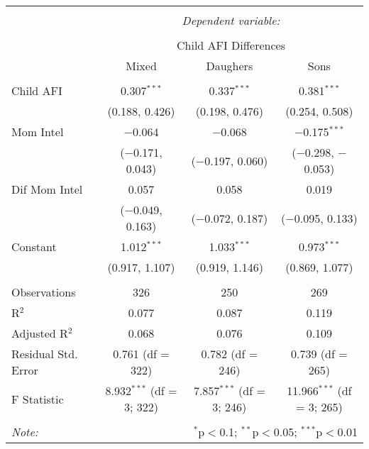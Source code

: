 
\begingroup 
\small 
\begin{tabular}{@{\extracolsep{1pt}}lccc} 
\\[-1.8ex]\hline 
\hline \\[-1.8ex] 
 & \multicolumn{3}{c}{\textit{Dependent variable:}} \\ 
\cline{2-4} 
\\[-1.8ex] & \multicolumn{3}{c}{Child AFI Differences} \\ 
 & Mixed & Daughers & Sons \\ 
\hline \\[-1.8ex] 
 Child AFI & 0.307$^{***}$ & 0.337$^{***}$ & 0.381$^{***}$ \\ 
  & (0.188, 0.426) & (0.198, 0.476) & (0.254, 0.508) \\ 
  Mom Intel & $-$0.064 & $-$0.068 & $-$0.175$^{***}$ \\ 
  & ($-$0.171, 0.043) & ($-$0.197, 0.060) & ($-$0.298, $-$0.053) \\ 
  Dif Mom Intel & 0.057 & 0.058 & 0.019 \\ 
  & ($-$0.049, 0.163) & ($-$0.072, 0.187) & ($-$0.095, 0.133) \\ 
  Constant & 1.012$^{***}$ & 1.033$^{***}$ & 0.973$^{***}$ \\ 
  & (0.917, 1.107) & (0.919, 1.146) & (0.869, 1.077) \\ 
 \hline \\[-1.8ex] 
Observations & 326 & 250 & 269 \\ 
R$^{2}$ & 0.077 & 0.087 & 0.119 \\ 
Adjusted R$^{2}$ & 0.068 & 0.076 & 0.109 \\ 
Residual Std. Error & 0.761 (df = 322) & 0.782 (df = 246) & 0.739 (df = 265) \\ 
F Statistic & 8.932$^{***}$ (df = 3; 322) & 7.857$^{***}$ (df = 3; 246) & 11.966$^{***}$ (df = 3; 265) \\ 
\hline 
\hline \\[-1.8ex] 
\textit{Note:}  & \multicolumn{3}{r}{$^{*}$p$<$0.1; $^{**}$p$<$0.05; $^{***}$p$<$0.01} \\ 
\end{tabular} 
\endgroup 

